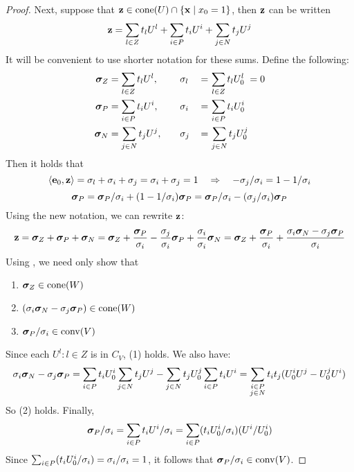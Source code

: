 \begin{proof}
	Next, suppose that $\mathbf{z} \in \operatorname{cone}(U) \cap \left\{\mathbf{x}\;|\; x_0 = 1\right\}$, then $\mathbf{z}$ can be written
	\[ \mathbf{z} = \sum_{l\in Z} t_l U^l + \sum_{i\in P} t_i U^i + \sum_{j\in N} t_j U^j \]
	It will be convenient to use shorter notation for these sums.  Define the following:
	\begin{alignat*}{3}
		\bm{\sigma}_Z & = \sum_{l\in Z} t_l U^l, \quad &  & \sigma_l \, & = & \, \sum_{l\in Z} t_l U^l_{0} \;= 0 \\
		\bm{\sigma}_P & = \sum_{i\in P} t_i U^i, \quad &  & \sigma_i \, & = & \, \sum_{i\in P} t_i U^i_{0}       \\
		\bm{\sigma}_N & = \sum_{j\in N} t_j U^j, \quad &  & \sigma_j \, & = & \, \sum_{j\in N} t_j U^j_{0}
	\end{alignat*}
	Then it holds that
	\[ \left\langle \mathbf{e}_0, \mathbf{z} \right\rangle = \sigma_l + \sigma_i + \sigma_j = \sigma_i + \sigma_j = 1
		\quad\Rightarrow\quad -\sigma_j/\sigma_i = 1 - 1/\sigma_i \]
	\[ \bm{\sigma}_P = \bm{\sigma}_P/\sigma_i + (1-1/\sigma_i)\bm{\sigma}_P
		= \bm{\sigma}_P/\sigma_i - (\sigma_j/\sigma_i)\bm{\sigma}_P \]
	Using the new notation, we can rewrite $\mathbf{z}$:
	\[ \mathbf{z} = \bm{\sigma}_Z + \bm{\sigma}_P + \bm{\sigma}_N
		= \bm{\sigma}_Z + \frac{\bm{\sigma}_P}{\sigma_i} - \frac{\sigma_j}{\sigma_i}\bm{\sigma}_P
		+ \frac{\sigma_i}{\sigma_i}\bm{\sigma}_N
		= \bm{\sigma}_Z + \frac{\bm{\sigma}_P}{\sigma_i} +
		\frac{\sigma_i\bm{\sigma}_N - \sigma_j\bm{\sigma}_P}{\sigma_i}
	\]
	Using , we need only show that
	\begin{enumerate}
		\item $\bm{\sigma}_Z \in \operatorname{cone}(W)$
		\item $(\sigma_i\bm{\sigma}_N - \sigma_j\bm{\sigma}_P) \in \operatorname{cone}(W)$
		\item $\bm{\sigma}_P/\sigma_i \in \operatorname{conv}(V)$
	\end{enumerate}
	Since each $U^l : l \in Z$ is in $C_V$, (1) holds.  We also have:
	\[ \sigma_i\bm{\sigma}_N - \sigma_j\bm{\sigma}_P =
		\sum_{i\in P} t_iU^i_{0} \sum_{j\in N} t_j U^j - \sum_{j\in N} t_jU^j_{0} \sum_{i\in P} t_i U^i =
		\sum_{\substack{i\in P \\ j\in N}} t_i t_j(U^i_{0} U^j - U^j_{0} U^i) \]
	So (2) holds.  Finally,
	\[ \bm{\sigma}_P/\sigma_i = \sum_{i\in P} t_i U^i / \sigma_i = \sum_{i\in P} (t_i U^i_{0}/\sigma_i)(U^i/U^i_{0}) \]
	Since $\sum_{i\in P} (t_i U^i_{0}/\sigma_i) = \sigma_i / \sigma_i = 1$, it follows that $\bm{\sigma}_P / \sigma_i \in \operatorname{conv}(V)$.
\end{proof}

